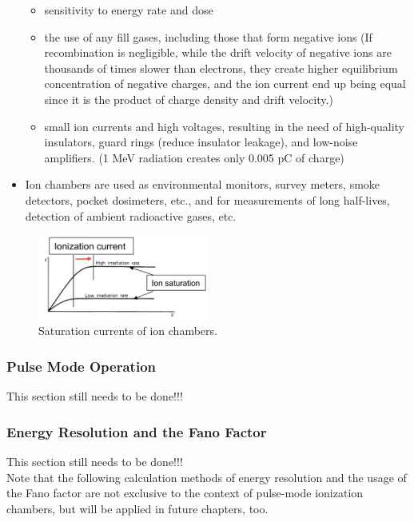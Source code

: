 \begin{itemize}
    \begin{itemize}
        \item sensitivity to energy rate and dose
        \item the use of any fill gases, including those that form negative ions (If recombination is negligible, while the drift velocity of negative ions are thousands of times slower than electrons, they create higher equilibrium concentration of negative charges, and the ion current end up being equal since it is the product of charge density and drift velocity.)
        \item small ion currents and high voltages, resulting in the need of high-quality insulators, guard rings (reduce insulator leakage), and low-noise amplifiers. (1 MeV radiation creates only 0.005 pC of charge)
    \end{itemize}
    \item Ion chambers are used as environmental monitors, survey meters, smoke detectors,  pocket dosimeters, etc., and for measurements of long half-lives, detection of ambient radioactive gases, etc. 
\end{itemize}
\begin{figure}[ht]
    \centering
    \includegraphics[width=0.5\textwidth]{images/ion_chamber_saturation_current.png}
    \caption{Saturation currents of ion chambers.}
    \label{fig:ion_chamber_saturation_current}
\end{figure}
\subsubsection{Pulse Mode Operation}
{\color{red} This section still needs to be done!!!}

\subsubsection{Energy Resolution and the Fano Factor}
{\color{red} This section still needs to be done!!!}\\
Note that the following calculation methods of energy resolution and the usage of the Fano factor are not exclusive to the context of pulse-mode ionization chambers, but will be applied in future chapters, too.

